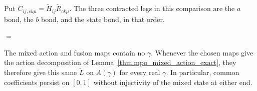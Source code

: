 Put $C_{ij,ck\mu}=\widetilde H_{ij}\widetilde R_{ck\mu}$.
The three contracted legs in this comparison are the $a$ bond,
the $b$ bond, and the state bond, in that order.
\tenkzkernel
\begin{tenkzequation}
    \begin{tenkz}[rows={wire}, cols=1, bonds=none]
    \end{tenkz}
    $=$
    \begin{tenkz}[rows={wire,wire,wire}, cols=2, bonds=none]
    \end{tenkz}
\end{tenkzequation}

The mixed action and fusion maps contain no $\gamma$. Whenever the
chosen maps give the action decomposition of
Lemma~\ref{thm:mpo_mixed_action_exact}, they therefore give this same
$\widetilde L$ on $A(\gamma)$ for every real $\gamma$. In particular,
common coefficients persist on $[0,1]$ without injectivity of the mixed
state at either end.

